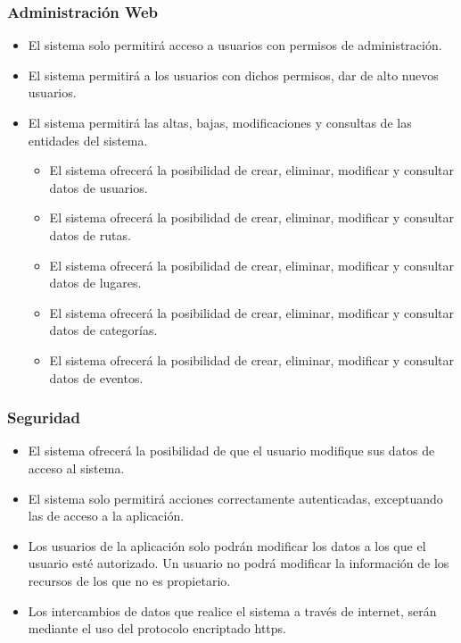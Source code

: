 \subsubsection*{Administración Web}
\begin{itemize}
\setlength\itemsep{1pt}
\item El sistema solo permitirá acceso a usuarios con permisos de administración.
\item El sistema permitirá a los usuarios con dichos permisos, dar de alto nuevos usuarios.
\item El sistema permitirá las altas, bajas, modificaciones y consultas de las entidades del sistema.
	\begin{itemize}
	\item El sistema ofrecerá la posibilidad de crear, eliminar, modificar y consultar datos de usuarios.
	\item El sistema ofrecerá la posibilidad de crear, eliminar, modificar y consultar datos de rutas.
	\item El sistema ofrecerá la posibilidad de crear, eliminar, modificar y consultar datos de lugares.
	\item El sistema ofrecerá la posibilidad de crear, eliminar, modificar y consultar datos de categorías.
	\item El sistema ofrecerá la posibilidad de crear, eliminar, modificar y consultar datos de eventos.
	\end{itemize}

\end{itemize}

\subsubsection*{Seguridad}
\begin{itemize}
\setlength\itemsep{1pt}
\item El sistema ofrecerá la posibilidad de que el usuario modifique sus datos de acceso al sistema.
\item El sistema solo permitirá acciones correctamente autenticadas, exceptuando las de acceso a la aplicación.
\item Los usuarios de la aplicación solo podrán modificar los datos a los que el usuario esté autorizado. Un usuario no podrá modificar la información de los recursos de los que no es propietario.
\item Los intercambios de datos que realice el sistema a través de internet, serán mediante el uso del protocolo encriptado https.
\end{itemize}


